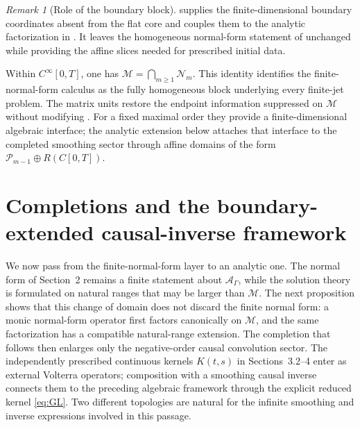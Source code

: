 \documentclass[11pt]{article}
\numberwithin{equation}{section}
\theoremstyle{definition}
\theoremstyle{remark}
\newtheorem{remark}{Remark}
\newcommand{\M}{\mathcal M}
\newcommand{\A}{\mathcal A}
\begin{document}
\begin{remark}[Role of the boundary block]
 supplies the finite-dimensional boundary coordinates absent from the flat core and couples them to the analytic factorization in . It leaves the homogeneous normal-form statement of  unchanged while providing the affine slices needed for prescribed initial data.
\end{remark}

Within $C^\infty[0,T]$, one has $\M=\bigcap_{m\ge1}\mathcal N_m$. This identity identifies the finite-normal-form calculus as the fully homogeneous block underlying every finite-jet problem. The matrix units restore the endpoint information suppressed on $\M$ without modifying . For a fixed maximal order they provide a finite-dimensional algebraic interface; the analytic extension below attaches that interface to the completed smoothing sector through affine domains of the form $\mathcal P_{m-1}\oplus R(C[0,T])$.

\section{Completions and the boundary-extended causal-inverse framework}

We now pass from the finite-normal-form layer to an analytic one. The normal form of Section~2 remains a finite statement about $\A_\Gamma$, while the solution theory is formulated on natural ranges that may be larger than $\M$.  The next proposition shows that this change of domain does not discard the finite normal form: a monic normal-form operator first factors canonically on $\M$, and the same factorization has a compatible natural-range extension.  The completion that follows then enlarges only the negative-order causal convolution sector. The independently prescribed continuous kernels $K(t,s)$ in Sections~3.2--4 enter as external Volterra operators; composition with a smoothing causal inverse connects them to the preceding algebraic framework through the explicit reduced kernel \eqref{eq:GL}. Two different topologies are natural for the infinite smoothing and inverse expressions involved in this passage.
\end{document}
